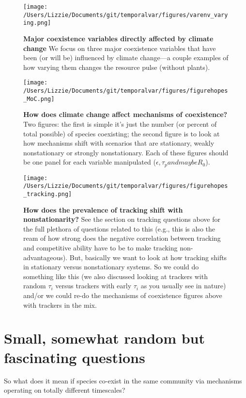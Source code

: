 \documentclass[11pt,a4paper,oneside]{article}
\begin{document}
\begin{figure}[h!]
\centering
\noindent \texttt{[image: /Users/Lizzie/Documents/git/temporalvar/figures/varenv\_varying.png]}
\caption{{\bf Major coexistence variables directly affected by
    climate change}  We focus on three major coexistence variables
  that have been (or will be) influenced by climate change---a couple
  examples of how varying them changes the resource pulse (without plants).}
\end{figure}

\newpage
\begin{figure}[h!]
\centering
\noindent \texttt{[image: /Users/Lizzie/Documents/git/temporalvar/figures/figurehopes\_MoC.png]}
\caption{{\bf How does climate change affect mechanisms of coexistence?} Two figures: the first is simple it's just the number (or percent of total possible) of species coexisting; the second figure is to look at how mechanisms shift with scenarios that are stationary, weakly nonstationary or strongly nonstationary. Each of these figures should be one panel for each variable manipulated (\(\epsilon, \tau_{p} and maybe R_{0}\)).}
\end{figure}

\newpage
\begin{figure}[h!]
\centering
\noindent \texttt{[image: /Users/Lizzie/Documents/git/temporalvar/figures/figurehopes\_tracking.png]}
\caption{{\bf How does the prevalence of tracking shift with nonstationarity?} See the section on tracking questions above for the full plethora of questions related to this (e.g., this is also the ream of how strong does the negative correlation between tracking and competitive ability have to be to make tracking non-advantageous). But, basically we want to look at how tracking shifts in stationary versus nonstationary systems. So we could do something like this (we also discussed looking at trackers with random \(\tau_{i}\) versus trackers with early \(\tau_{i}\) as you usually see in nature) and/or we could re-do the mechanisms of coexistence figures above with trackers in the mix.}
\end{figure}

\newpage
\section{Small, somewhat random but fascinating questions} 
\noindent So what does it mean if species co-exist in the same community via mechanisms operating on totally different timescales?\\
\end{document}
